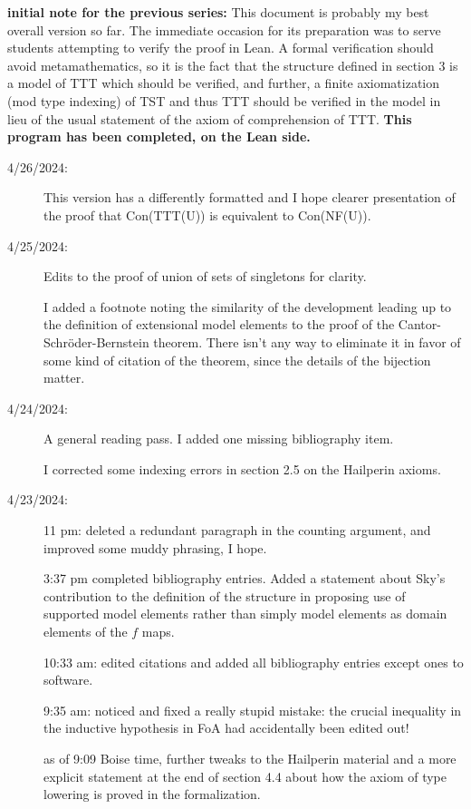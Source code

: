 \documentclass[112pt]{article}
\begin{document}
{\bf initial note for the previous series:}  This document is probably my best overall version so far.  The immediate occasion for its preparation was to serve students attempting to verify the proof in Lean.  A formal verification should avoid metamathematics, so it is the fact that the structure defined in section 3 is a model of TTT which should be verified, and further, a finite axiomatization (mod type indexing) of TST and thus TTT should be verified in the model in lieu of the usual statement of the axiom of comprehension of TTT.  {\bf This program has been completed, on the Lean side.}
\begin{description}

\item[4/26/2024:]  This version has a differently formatted and I hope clearer presentation of the proof that Con(TTT(U)) is equivalent to Con(NF(U)).

\item[4/25/2024:]  Edits to the proof of union of sets of singletons for clarity.

I added a footnote noting the similarity of the development leading up to the definition of
extensional model elements to the proof of the Cantor-Schr\"oder-Bernstein theorem.  There isn't any way to eliminate it in favor of some kind of citation of the theorem, since the details of the bijection matter.

\item[4/24/2024:]  A general reading pass.  I added one missing bibliography item.

I corrected some indexing errors in section 2.5 on the Hailperin axioms.

\item[4/23/2024:]  

11 pm:  deleted a redundant paragraph in the counting argument, and improved some muddy phrasing, I hope.

3:37 pm completed bibliography entries.  Added a statement about Sky's contribution to the definition of the structure in proposing use of supported model elements rather than simply model elements as domain elements of the $f$ maps.

10:33 am:  edited citations and added all bibliography entries except ones to software.

9:35 am:  noticed and fixed a really stupid mistake:  the crucial inequality in the inductive hypothesis in FoA had accidentally been edited out!

as of 9:09 Boise time, further tweaks to the Hailperin material and a more explicit statement at the end of section 4.4 about how the axiom of type lowering is proved in the formalization.




\end{description}
\end{document}
